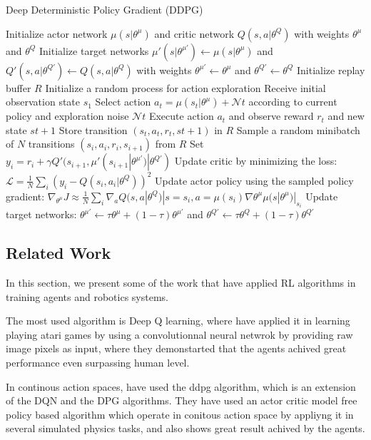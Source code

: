 \documentclass[12pt]{extarticle}
\begin{document}
 
\begin{algorithm}[H]
\caption{Deep Deterministic Policy Gradient (DDPG)}
\label{alg:ddpg}
\begin{algorithmic}[1]
\State Initialize actor network $\mu(s|\theta^\mu)$ and critic network $Q(s,a|\theta^Q)$ with weights $\theta^\mu$ and $\theta^Q$
\State Initialize target networks $\mu'(s|\theta^{\mu'}) \leftarrow \mu(s|\theta^\mu)$ and $Q'(s,a|\theta^{Q'}) \leftarrow Q(s,a|\theta^Q)$ with weights $\theta^{\mu'} \leftarrow \theta^\mu$ and $\theta^{Q'} \leftarrow \theta^Q$
\State Initialize replay buffer $R$
\State Initialize a random process for action exploration
\State Receive initial observation state $s_1$
\State Select action $a_t = \mu(s_t|\theta^\mu) + \mathcal{N}t$ according to current policy and exploration noise $\mathcal{N}t$
\State Execute action $a_t$ and observe reward $r_t$ and new state $s{t+1}$
\State Store transition $(s_t, a_t, r_t, s{t+1})$ in $R$
\State Sample a random minibatch of $N$ transitions $(s_i, a_i, r_i, s_{i+1})$ from $R$
\State Set $y_i = r_i + \gamma Q'(s_{i+1},\mu'(s_{i+1}|\theta^{\mu'})|\theta^{Q'})$
\State Update critic by minimizing the loss: $\mathcal{L} = \frac{1}{N}\sum_i(y_i - Q(s_i,a_i|\theta^Q))^2$
\State Update actor policy using the sampled policy gradient: $\nabla_{\theta^\mu} J \approx \frac{1}{N}\sum_i \nabla_a Q(s,a|\theta^Q)|{s=s_i,a=\mu(s_i)} \nabla{\theta^\mu} \mu(s|\theta^\mu)|_{s_i}$
\State Update target networks: $\theta^{\mu'} \leftarrow \tau \theta^\mu + (1-\tau)\theta^{\mu'}$ and $\theta^{Q'} \leftarrow \tau \theta^Q + (1-\tau)\theta^{Q'}$
\EndFor
\EndFor
\end{algorithmic}
\end{algorithm}




\subsection{Related Work}
In this section, we present some of the work that have applied RL algorithms in  training agents and robotics systems.


The most used algorithm  is Deep Q learning, where  \cite{mnih2013playing} have applied it in learning playing atari games by using a convolutionnal neural netwrok by providing raw image pixels as input, where they demonstarted that the agents achived great performance even surpassing human level.

In continous action spaces, \cite{lillicrap2015continuous} have used the ddpg algorithm, which is an extension of the DQN and the DPG algorithms. They have used an actor critic model free  policy based algorithm which operate in conitous action space by appliyng it in several simulated physics tasks, and also shows great result achived by the agents.
\end{document}
